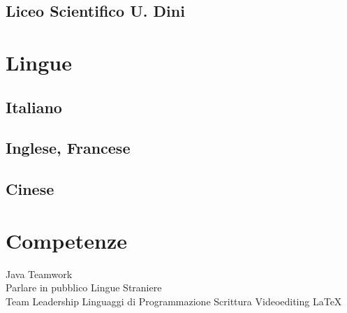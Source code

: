 \documentclass[a4paper]{deedy-resume} %
\begin{document}
\begin{minipage}[t]{0.33\textwidth}
\sectionspace %


\subsection{Liceo Scientifico U. Dini}


\sectionspace %


\section{Lingue}

\subsection{Italiano}

\subsection{Inglese, Francese}


\subsection{Cinese}

\sectionspace %


\section{Competenze}

Java \textbullet{} Teamwork \textbullet{} \\Parlare in pubblico \textbullet{} Lingue Straniere\textbullet{}\\
Team Leadership\textbullet{} Linguaggi di Programmazione \textbullet{} Scrittura \textbullet{} Videoediting \textbullet{} \LaTeX\ \\ 


\end{minipage}
\end{document}
